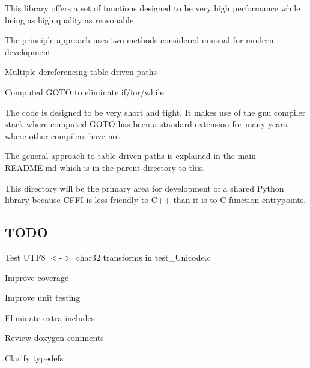 This library offers a set of functions designed to be very high performance while being as high quality as reasonable.

The principle approach uses two methods considered unusual for modern development.
\begin{DoxyItemize}
\item Multiple dereferencing table-\/driven paths
\item Computed G\+O\+T\+O to eliminate if/for/while
\end{DoxyItemize}

The code is designed to be very short and tight. It makes use of the gnu compiler stack where computed G\+O\+T\+O has been a standard extension for many years, where other compilers have not.

The general approach to table-\/driven paths is explained in the main R\+E\+A\+D\+M\+E.\+md which is in the parent directory to this.

This directory will be the primary area for development of a shared Python library because C\+F\+F\+I is less friendly to C++ than it is to C function entrypoints.

\subsection*{T\+O\+D\+O}


\begin{DoxyItemize}
\item Test U\+T\+F8 $<$-\/$>$ char32 transforms in test\+\_\+\+Unicode.\+c
\item Improve coverage
\item Improve unit testing
\item Eliminate extra includes
\item Review doxygen comments
\item Clarify typedefs 
\end{DoxyItemize}